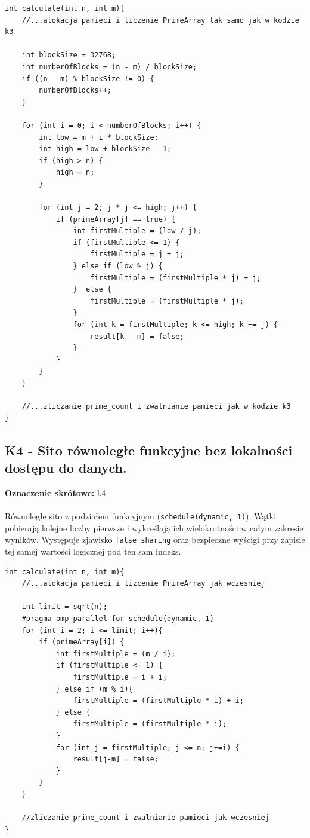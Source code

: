 \documentclass[10pt]{article}
\begin{document}
\begin{lstlisting}[style=mystyle, caption={Kod programu k3a.cpp}, label={lst:k3a}]
int calculate(int n, int m){
    //...alokacja pamieci i liczenie PrimeArray tak samo jak w kodzie k3

    int blockSize = 32768; 
    int numberOfBlocks = (n - m) / blockSize;
    if ((n - m) % blockSize != 0) { 
        numberOfBlocks++;
    }

    for (int i = 0; i < numberOfBlocks; i++) {
        int low = m + i * blockSize; 
        int high = low + blockSize - 1;
        if (high > n) {
            high = n;
        }

        for (int j = 2; j * j <= high; j++) {
            if (primeArray[j] == true) {
                int firstMultiple = (low / j);
                if (firstMultiple <= 1) {
                    firstMultiple = j + j;
                } else if (low % j) {
                    firstMultiple = (firstMultiple * j) + j;
                }  else {
                    firstMultiple = (firstMultiple * j);
                }
                for (int k = firstMultiple; k <= high; k += j) {
                    result[k - m] = false;
                }
            }
        }
    }

	//...zliczanie prime_count i zwalnianie pamieci jak w kodzie k3
}
\end{lstlisting}

\newpage
\subsection*{K4 - Sito równoległe funkcyjne bez lokalności dostępu do danych.}
\textbf{Oznaczenie skrótowe:} k4
\\ \\
Równoległe sito z podziałem funkcyjnym (\texttt{schedule(dynamic, 1)}). Wątki pobierają kolejne liczby pierwsze i wykreślają ich wielokrotności w 
całym zakresie wyników. Występuje zjawisko \texttt{false sharing} oraz bezpieczne wyścigi przy zapisie tej samej wartości logicznej pod ten sam indeks.
\\

\begin{lstlisting}[style=mystyle, caption={Kod programu k4.cpp}, label={lst:k4}]
int calculate(int n, int m){
	//...alokacja pamieci i lizcenie PrimeArray jak wczesniej 

	int limit = sqrt(n);
	#pragma omp parallel for schedule(dynamic, 1)
	for (int i = 2; i <= limit; i++){
		if (primeArray[i]) {
			int firstMultiple = (m / i);
			if (firstMultiple <= 1) {
				firstMultiple = i + i;
			} else if (m % i){ 
				firstMultiple = (firstMultiple * i) + i;
			} else {
				firstMultiple = (firstMultiple * i);
			}
			for (int j = firstMultiple; j <= n; j+=i) {
				result[j-m] = false;
			}
		}
	}

	//zliczanie prime_count i zwalnianie pamieci jak wczesniej
}
\end{lstlisting}
\end{document}
